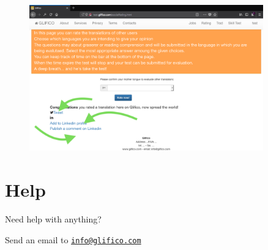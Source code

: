 \documentclass[11 pt, a4paper]{article}
\begin{document}
\begin{figure}[H]
\centering
\includegraphics[width=0.9\textwidth]{translator_socialrating9.png}
\end{figure}

\clearpage
\section{Help}
Need help with anything?

Send an email to \href{mailto:info@glifico.com}{\nolinkurl{info@glifico.com}}
\end{document}
